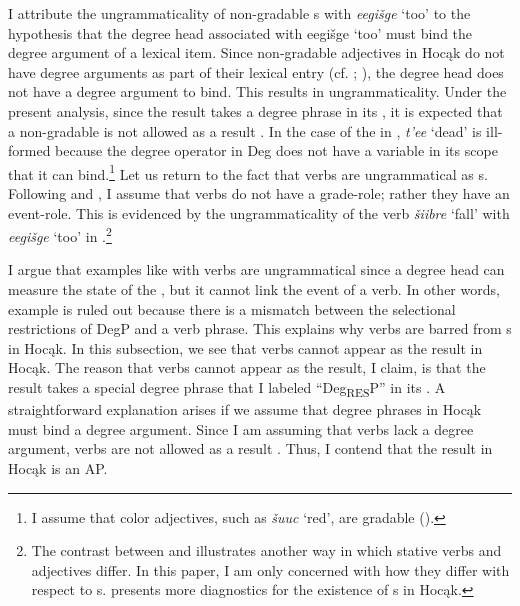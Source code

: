 \documentclass[output=paper]{LSP/langsci}
\begin{document}
I attribute the ungrammaticality of non-gradable s with \textit{eegišge} `too' to the hypothesis that the degree head associated with eegišge `too' must bind the degree argument of a lexical item. Since non-gradable adjectives in Hocąk do not have degree arguments as part of their lexical entry (cf. \citealt{Higginbotham1985}; \citealt{Corver1997}), the degree head does not have a degree argument to bind. This results in ungrammaticality. Under the present analysis, since the result takes a degree phrase in its , it is expected that a non-gradable  is not allowed as a result . In the case of the  in , \textit{t'ee} `dead' is ill-formed because the degree operator in Deg does not have a variable in its scope that it can bind.\footnote{I assume that color adjectives, such as \textit{šuuc} `red', are gradable (\citealt{KennedyMcNally2010}).} Let us return to the fact that verbs are ungrammatical as  s. Following \citet{Higginbotham1985} and \citet{Corver1997}, I assume that verbs do not have a grade-role; rather they have an event-role. This is evidenced by the ungrammaticality of the verb \textit{šiibre} `fall' with \textit{eegišge} `too' in .\footnote{The contrast between  and  illustrates another way in which stative verbs and adjectives differ. In this paper, I am only concerned with how they differ with respect to s. \citet{Rosen2014,Rosen2015} presents more diagnostics for the existence of s in Hocąk.}

\begin{exe}


\end{exe}

I argue that  examples like  with verbs are ungrammatical since a degree head can measure the state of the , but it cannot link the event of a verb. In other words, example  is ruled out because there is a mismatch between the selectional restrictions of DegP and a verb phrase. This explains why verbs are barred from s in Hocąk. In this subsection, we see that verbs cannot appear as the result  in Hocąk. The reason that verbs cannot appear as the result, I claim, is that the result  takes a special degree phrase that I labeled ``Deg\textsubscript{RES}P'' in its . A straightforward explanation arises if we assume that degree phrases in Hocąk must bind a degree argument. Since I am assuming that verbs lack a degree argument, verbs are not allowed as a result . Thus, I contend that the result  in Hocąk is an AP.
\end{document}
